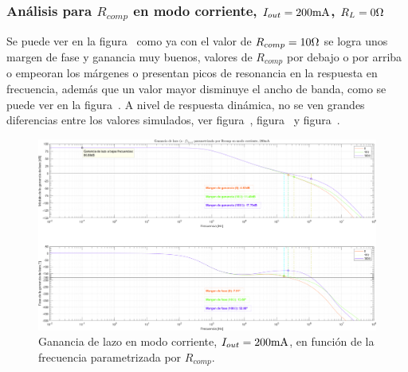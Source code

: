 \clearpage


\subsubsection{Análisis para $R_{comp}$ en modo corriente, $I_{out} = 200 \si[per-mode=symbol]{\milli\ampere}$, $R_{L} = 0 \si[per-mode=symbol]{\ohm}$}
Se puede ver en la figura~ como ya con el valor de $R_{comp} = 10 \si[per-mode=symbol]{\ohm}$ se logra unos margen de fase y ganancia muy buenos, valores de $R_{comp}$ por debajo o por arriba o empeoran los márgenes o presentan picos de resonancia en la respuesta en frecuencia, además que un valor mayor disminuye el ancho de banda, como se puede ver en la figura~. A nivel de respuesta dinámica, no se ven grandes diferencias entre los valores simulados, ver figura~, figura~ y figura~.

\vfill



\clearpage

\begin{figure}[H] %
\begin{center}
\includegraphics[width=1.1 \textwidth, angle=90]{./img/plots/loop/power_supply_RCOMP_LOOP_Modo4.png}
\caption{\label{fig:fig_power_supply_RCOMP_LOOP_Modo4}\footnotesize{Ganancia de lazo en modo corriente, $I_{out} = 200 \si[per-mode=symbol]{\milli\ampere}$, en función de la frecuencia parametrizada por $R_{comp}$.}}
\end{center}
\end{figure}


\clearpage

